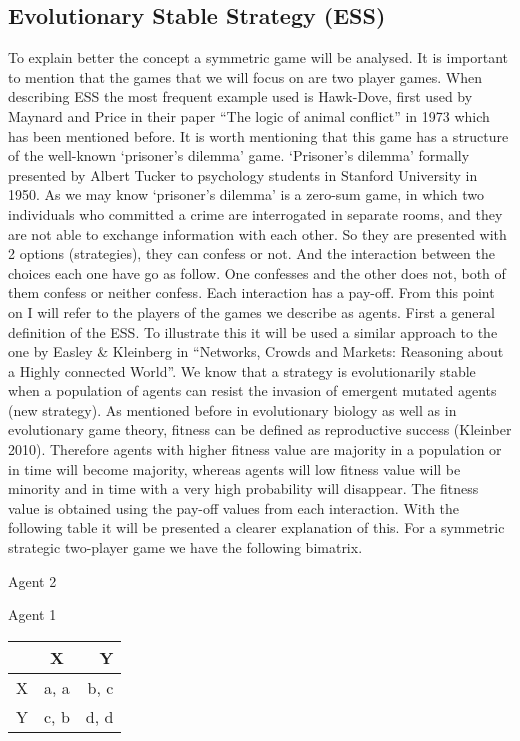 \documentclass{article}
\begin{document}
\subsection{Evolutionary Stable Strategy (ESS)}
To explain better the concept a symmetric game will be analysed. It is important to mention that the games that we will focus on are two player games.
When describing ESS the most frequent example used is Hawk-Dove, first used by Maynard and Price in their paper “The logic of animal conflict” in 1973 which has been mentioned before. It is worth mentioning that this game has a structure of the well-known ‘prisoner’s dilemma’ game. ‘Prisoner’s dilemma’ formally presented by Albert Tucker to psychology students in Stanford University in 1950. As we may know ‘prisoner’s dilemma’ is a zero-sum game, in which two individuals who committed a crime are interrogated in separate rooms, and they are not able to exchange information with each other. So they are presented with 2 options (strategies), they can confess or not. And the interaction between the choices each one have go as follow. One confesses and the other does not, both of them confess or neither confess. Each interaction has a pay-off. From this point on I will refer to the players of the games we describe as agents.
First a general definition of the ESS. To illustrate this it will be used a similar approach to the one by Easley \& Kleinberg in “Networks, Crowds and Markets: Reasoning about a Highly connected World”.
We know that a strategy is evolutionarily stable when a population of agents can resist the invasion of emergent mutated agents (new strategy). As mentioned before in evolutionary biology as well as in evolutionary game theory, fitness can be defined as reproductive success (Kleinber 2010). Therefore agents with higher fitness value are majority in a population or in time will become majority, whereas agents will low fitness value will be minority and in time with a very high probability will disappear. The fitness value is obtained using the pay-off values from each interaction. With the following table it will be presented a clearer explanation of this.
For a symmetric strategic two-player game we have the following bimatrix.
\begin{center}
Agent 2

Agent 1
\begin{tabular}{|l|c|r|}
\hline
 & X & Y\\
\hline
X & a, a & b, c\\
\hline
Y & c, b & d, d\\
\hline
\end{tabular}
\end{center}
\end{document}
